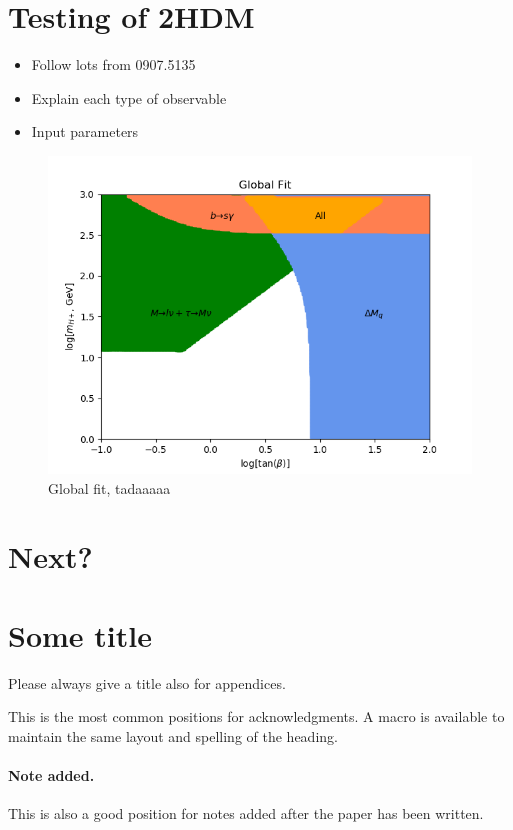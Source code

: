 \documentclass[a4paper,12pt]{article}
\begin{document}
\section{Testing of 2HDM}
\begin{itemize}
    \item Follow lots from 0907.5135
    \item Explain each type of observable
    \item Input parameters
\end{itemize}
\begin{figure}[H]
    \centering
    \includegraphics[scale=0.8]{../calcs/global.png}
    \caption{\label{fig:glob} Global fit, tadaaaaa}
\end{figure}

\section{Next?}

\appendix
\section{Some title}
Please always give a title also for appendices.

\acknowledgments
This is the most common positions for acknowledgments. A macro is
available to maintain the same layout and spelling of the heading.

\paragraph{Note added.} This is also a good position for notes added
after the paper has been written.
\end{document}
